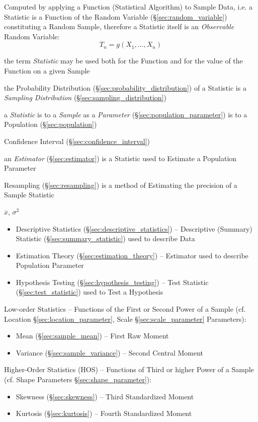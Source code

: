 Computed by applying a Function (Statistical Algorithm) to Sample Data, i.e. a
Statistic is a Function of the Random Variable (\S\ref{sec:random_variable})
constituting a Random Sample, therefore a Statistic itself is an
\emph{Observable} Random Variable:
\[
  T_n = g(X_1, \ldots, X_n)
\]

the term \emph{Statistic} may be used both for the Function and for the value of
the Function on a given Sample

the Probability Distribution (\S\ref{sec:probability_distribution}) of a
Statistic is a \emph{Sampling Distribution} (\S\ref{sec:sampling_distribution})

a \emph{Statistic} is to a \emph{Sample} as a \emph{Parameter}
(\S\ref{sec:population_parameter}) is to a Population (\S\ref{sec:population})

Confidence Interval (\S\ref{sec:confidence_interval})

\fist an \emph{Estimator} (\S\ref{sec:estimator}) is a Statistic used to
Estimate a Population Parameter

\fist Resampling (\S\ref{sec:resampling}) is a method of Estimating the
precision of a Sample Statistic

$\overline{x}$, $\sigma^2$

\begin{itemize}
  \item Descriptive Statistics (\S\ref{sec:descriptive_statistics}) --
    Descriptive (Summary) Statistic (\S\ref{sec:summary_statistic}) used to
    describe Data
  \item Estimation Theory (\S\ref{sec:estimation_theory}) -- Estimator used to
    describe Population Parameter
  \item Hypothesis Testing (\S\ref{sec:hypothesis_testing}) -- Test Statistic
    (\S\ref{sec:test_statistic}) used to Test a Hypothesis
\end{itemize}

Low-order Statistics -- Functions of the First or Second Power of a Sample (cf.
Location \S\ref{sec:location_parameter}, Scale \S\ref{sec:scale_parameter}
Parameters):
\begin{itemize}
  \item Mean (\S\ref{sec:sample_mean}) -- First Raw Moment
  \item Variance (\S\ref{sec:sample_variance}) -- Second Central Moment
\end{itemize}

Higher-Order Statistics (HOS) -- Functions of Third or higher Power of a Sample
(cf. Shape Parameters \S\ref{sec:shape_parameter}):
\begin{itemize}
  \item Skewness (\S\ref{sec:skewness}) -- Third Standardized Moment
  \item Kurtosis (\S\ref{sec:kurtosis}) -- Fourth Standardized Moment
\end{itemize}

